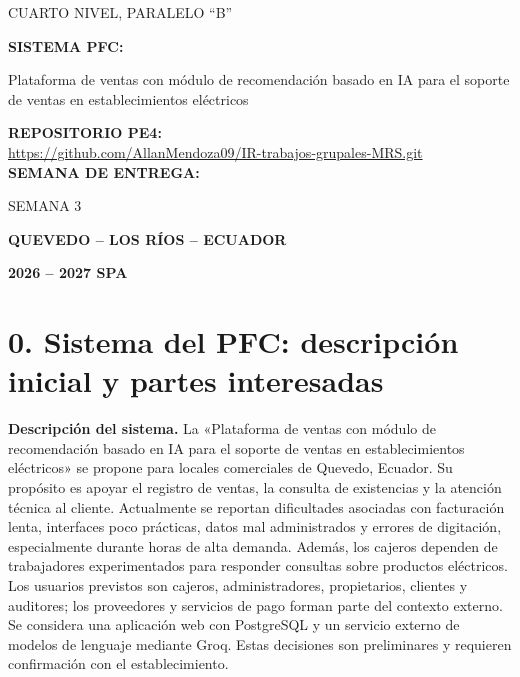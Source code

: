 \documentclass[onecolumn,12pt,a4paper]{IEEEtran}
\begin{document}
\begin{titlepage}
{\fontsize{12}{14}\selectfont CUARTO NIVEL, PARALELO ``B''}\par
\vspace{0.25cm}
{\fontsize{14}{16}\selectfont\textbf{SISTEMA PFC:}}\par
{\fontsize{12}{14}\selectfont Plataforma de ventas con módulo de recomendación basado en IA para el soporte de ventas en establecimientos eléctricos}\par
\vspace{0.25cm}
{\fontsize{14}{16}\selectfont \textbf{REPOSITORIO PE4:}}\\
{\fontsize{12}{14}\selectfont \url{https://github.com/AllanMendoza09/IR-trabajos-grupales-MRS.git}}\\[0.3cm]
{\fontsize{14}{16}\selectfont\textbf{SEMANA DE ENTREGA:}}\par
{\fontsize{12}{14}\selectfont SEMANA 3}\par
\vspace{0.45cm}
{\fontsize{14}{16}\selectfont\textbf{QUEVEDO -- LOS RÍOS -- ECUADOR}}\par
{\fontsize{14}{16}\selectfont\textbf{2026 -- 2027 SPA}}\par
\vfill
\end{titlepage}

\tableofcontents
\clearpage

\section*{0. Sistema del PFC: descripción inicial y partes interesadas}


\textbf{Descripción del sistema.} La «Plataforma de ventas con módulo de recomendación basado en IA para el soporte de ventas en establecimientos eléctricos» se propone para locales comerciales de Quevedo, Ecuador. Su propósito es apoyar el registro de ventas, la consulta de existencias y la atención técnica al cliente. Actualmente se reportan dificultades asociadas con facturación lenta, interfaces poco prácticas, datos mal administrados y errores de digitación, especialmente durante horas de alta demanda. Además, los cajeros dependen de trabajadores experimentados para responder consultas sobre productos eléctricos. Los usuarios previstos son cajeros, administradores, propietarios, clientes y auditores; los proveedores y servicios de pago forman parte del contexto externo. Se considera una aplicación web con PostgreSQL y un servicio externo de modelos de lenguaje mediante Groq. Estas decisiones son preliminares y requieren confirmación con el establecimiento.
\end{document}
